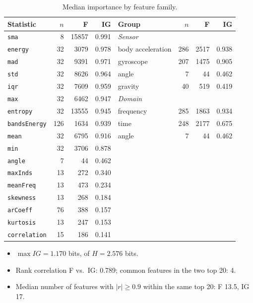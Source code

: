 \documentclass[a4paper, 11pt]{article}
\begin{document}
\begin{table}[htbp]
\centering
\caption{Median importance by feature family.}
\label{tab:families}
\footnotesize
\begin{tabular}{lrrr@{\hspace{3em}}lrrr}
\toprule
Statistic & $n$ & F & IG & Group & $n$ & F & IG \\
\midrule
\texttt{sma} & 8 & 15857 & 0.991 & \multicolumn{4}{l}{\textit{Sensor}} \\
\texttt{energy} & 32 & 3079 & 0.978 & body acceleration & 286 & 2517 & 0.938 \\
\texttt{mad} & 32 & 9391 & 0.971 & gyroscope & 207 & 1475 & 0.905 \\
\texttt{std} & 32 & 8626 & 0.964 & angle & 7 & 44 & 0.462 \\
\texttt{iqr} & 32 & 7609 & 0.959 & gravity & 40 & 519 & 0.419 \\
\texttt{max} & 32 & 6462 & 0.947 & \multicolumn{4}{l}{\textit{Domain}} \\
\texttt{entropy} & 32 & 13555 & 0.945 & frequency & 285 & 1863 & 0.934 \\
\texttt{bandsEnergy} & 126 & 1634 & 0.939 & time & 248 & 2177 & 0.675 \\
\texttt{mean} & 32 & 6795 & 0.916 & angle & 7 & 44 & 0.462 \\
\texttt{min} & 32 & 3706 & 0.878 & & & & \\
\texttt{angle} & 7 & 44 & 0.462 & & & & \\
\texttt{maxInds} & 13 & 272 & 0.340 & & & & \\
\texttt{meanFreq} & 13 & 473 & 0.234 & & & & \\
\texttt{skewness} & 13 & 268 & 0.184 & & & & \\
\texttt{arCoeff} & 76 & 388 & 0.157 & & & & \\
\texttt{kurtosis} & 13 & 247 & 0.153 & & & & \\
\texttt{correlation} & 15 & 186 & 0.141 & & & & \\
\bottomrule
\end{tabular}
\end{table}

\begin{itemize}
  \item $\max IG = 1.170$ bits, of $H = 2.576$ bits.
  \item Rank correlation F vs.\ IG: 0.789; common features in the two top 20: 4.
  \item Median number of features with $|r| \geq 0.9$ within the same top 20: F 13.5, IG 17.
\end{itemize}
\end{document}
